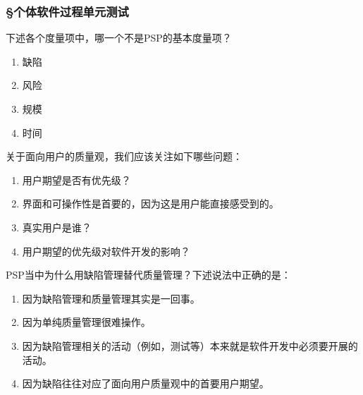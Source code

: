 \subsubsection*{\S 个体软件过程单元测试}
\setcounter{problemname}{0}

\begin{problem}
    下述各个度量项中，哪一个不是PSP的基本度量项？
    \vspace{-0.8em}
    \begin{multicols}{4}
        \begin{enumerate}[label=\Alph*.]
            \item 缺陷
            \item 风险
            \item 规模
            \item 时间
        \end{enumerate}
    \end{multicols}
    \vspace{-1em}
\end{problem}



\begin{problem}
    关于面向用户的质量观，我们应该关注如下哪些问题：
        \begin{enumerate}[label=\Alph*.]
            \item 用户期望是否有优先级？
            \item 界面和可操作性是首要的，因为这是用户能直接感受到的。
            \item 真实用户是谁？
            \item 用户期望的优先级对软件开发的影响？
        \end{enumerate}
\end{problem}



\begin{problem}
	PSP当中为什么用缺陷管理替代质量管理？下述说法中正确的是：
        \begin{enumerate}[label=\Alph*.]
            \item 因为缺陷管理和质量管理其实是一回事。
            \item 因为单纯质量管理很难操作。
            \item 因为缺陷管理相关的活动（例如，测试等）本来就是软件开发中必须要开展的活动。
            \item 因为缺陷往往对应了面向用户质量观中的首要用户期望。
        \end{enumerate}
\end{problem}



